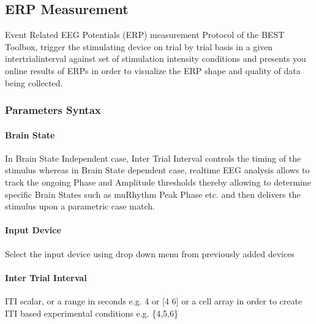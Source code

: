 \documentclass[letterpaper,10pt,english]{sphinxmanual}
\begin{document}
\begin{figure}[htbp]
\centering

\noindent{}
\end{figure}


\subsection{ERP Measurement}
\label{\detokenize{14_ERPMeasurement:erp-measurement}}\label{\detokenize{14_ERPMeasurement::doc}}
\sphinxAtStartPar
Event Related EEG Potentials (ERP) measurement Protocol of the BEST Toolbox, trigger the stimulating device on trial by trial basis in a given inter\sphinxhyphen{}trial\sphinxhyphen{}interval against set of stimulation intensity conditions and presents you online results of ERPs in order to visualize the ERP shape and quality of data being collected.


\subsubsection{Parameters Syntax}
\label{\detokenize{14_ERPMeasurement:parameters-syntax}}

\paragraph{Brain State}
\label{\detokenize{14_ERPMeasurement:brain-state}}
\sphinxAtStartPar
In Brain State Independent case, Inter Trial Interval controls the timing of the stimulus whereas in Brain State dependent case, real\sphinxhyphen{}time EEG analysis allows to track the ongoing Phase and Amplitude thresholds thereby allowing to determine specific Brain States such as mu\sphinxhyphen{}Rhythm Peak Phase etc. and then delivers the stimulus upon a parametric case match.


\paragraph{Input Device}
\label{\detokenize{14_ERPMeasurement:input-device}}
\sphinxAtStartPar
Select the input device using drop down menu from previously added devices


\paragraph{Inter Trial Interval}
\label{\detokenize{14_ERPMeasurement:inter-trial-interval}}
\sphinxAtStartPar
ITI scalar, or a range in seconds e.g. 4 or {[}4 6{]} or a cell array in order to create ITI based experimental conditions e.g. \{4,5,6\}
\end{document}
